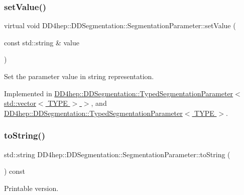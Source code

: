 \subsubsection{\texorpdfstring{set\+Value()}{setValue()}}
{\footnotesize\ttfamily virtual void D\+D4hep\+::\+D\+D\+Segmentation\+::\+Segmentation\+Parameter\+::set\+Value (\begin{DoxyParamCaption}\item[{const std\+::string \&}]{value }\end{DoxyParamCaption})\hspace{0.3cm}{\ttfamily [pure virtual]}}



Set the parameter value in string representation. 



Implemented in \hyperlink{class_d_d4hep_1_1_d_d_segmentation_1_1_typed_segmentation_parameter_3_01std_1_1vector_3_01_t_y_p_e_01_4_01_4_ad36f5a4953d42c4d9252423f129c50de}{D\+D4hep\+::\+D\+D\+Segmentation\+::\+Typed\+Segmentation\+Parameter$<$ std\+::vector$<$ T\+Y\+P\+E $>$ $>$}, and \hyperlink{class_d_d4hep_1_1_d_d_segmentation_1_1_typed_segmentation_parameter_a32e4b30c056572c1892b0607d05774e2}{D\+D4hep\+::\+D\+D\+Segmentation\+::\+Typed\+Segmentation\+Parameter$<$ T\+Y\+P\+E $>$}.

\hypertarget{class_d_d4hep_1_1_d_d_segmentation_1_1_segmentation_parameter_a30dd377a22d218dd74cb6f278b85b416}{}\label{class_d_d4hep_1_1_d_d_segmentation_1_1_segmentation_parameter_a30dd377a22d218dd74cb6f278b85b416} 
\subsubsection{\texorpdfstring{to\+String()}{toString()}}
{\footnotesize\ttfamily std\+::string D\+D4hep\+::\+D\+D\+Segmentation\+::\+Segmentation\+Parameter\+::to\+String (\begin{DoxyParamCaption}{ }\end{DoxyParamCaption}) const\hspace{0.3cm}{\ttfamily [inline]}}



Printable version. 



